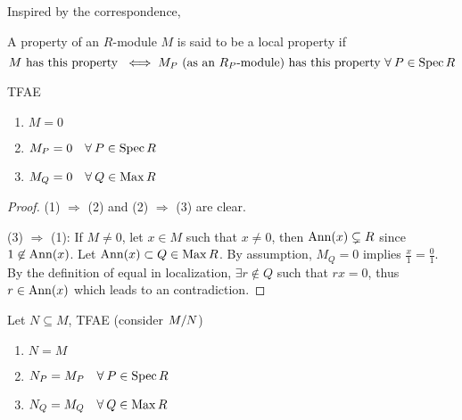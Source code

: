 \begin{remark}
  Inspired by the correspondence,
\end{remark}

\begin{definition}
  A property of an $R$-module $M$ is said to be a local property if
  \[
    M \text{ has this property } \iff M_P
    \text{ (as an $R_P$-module) has this property } \forall P \in \Spec R
  \]
\end{definition}

\begin{prop} \label{prop:module-is-zero-iff-zero-in-localization}
  TFAE
  \begin{enumerate}[(1)]
    \item $M = 0$
    \item $M_P = 0 \quad \forall P \in \Spec R$
    \item $M_Q = 0 \quad \forall Q \in \Max R$
  \end{enumerate}
  \begin{proof}
    (1) $\Rightarrow$ (2) and (2) $\Rightarrow$ (3) are clear.

    (3) $\Rightarrow$ (1):
    If $M \neq 0$, let $x \in M$ such that $x \neq 0$,
    then $\operatorname{Ann}(x) \subsetneq R$ since $1 \not\in \operatorname{Ann}(x)$.
    Let $\operatorname{Ann}(x) \subset Q \in \operatorname{Max} R$.
    By assumption, $M_Q = 0$ implies $\frac{x}{1} = \frac{0}{1}$.
    By the definition of equal in localization, $\exists r \not\in Q$
    such that $rx = 0$, thus $r \in \operatorname{Ann}(x)$ which leads to an contradiction.
  \end{proof}
\end{prop}

\begin{coro} \label{coro:modules-are-equal-iff-equal-in-localization}
  Let $N \subseteq M$, TFAE (consider ${M}/{N}$)
  \begin{enumerate}[(1)]
    \item $N = M$
    \item $N_P = M_P \quad \forall P \in \Spec R$
    \item $N_Q = M_Q \quad \forall Q \in \Max R$
  \end{enumerate}
\end{coro}

